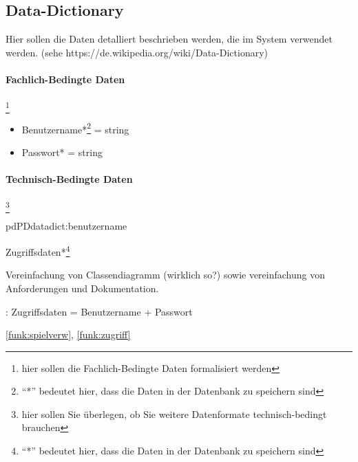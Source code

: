 \subsection{Data-Dictionary}

Hier sollen die Daten detalliert beschrieben werden, die im System verwendet werden. (sehe https://de.wikipedia.org/wiki/Data-Dictionary)

\paragraph{Fachlich-Bedingte Daten}\footnote{hier sollen die Fachlich-Bedingte Daten formalisiert werden}

\begin{itemize}
	\item[\ref{daten:benutzername}] Benutzername*\footnote{``*'' bedeutet hier, dass die Daten in der Datenbank zu speichern sind} = string
	\item[\ref{daten:benutzername}] Passwort* = string
\end{itemize}

\paragraph{Technisch-Bedingte Daten}\footnote{hier sollen Sie überlegen, ob Sie weitere Datenformate technisch-bedingt brauchen}

\setcounter{pd}{10}

\begin{description}[leftmargin=5em, style=sameline]
	
	\begin{lhp}{pd}{PD}{datadict:benutzername}
		\item [Name:] Zugriffsdaten*\footnote{``*'' bedeutet hier, dass die Daten in der Datenbank zu speichern sind}
		\item [Motivation:] Vereinfachung von Classendiagramm (wirklich so?) sowie vereinfachung von Anforderungen und Dokumentation.
		\item [Data-Dictionary Ausdruck]: Zugriffsdaten = Benutzername + Passwort
		\item [Relevante Systemfunktionen:]  \ref{funk:spielverw}, \ref{funk:zugriff}
	\end{lhp}
\end{description}